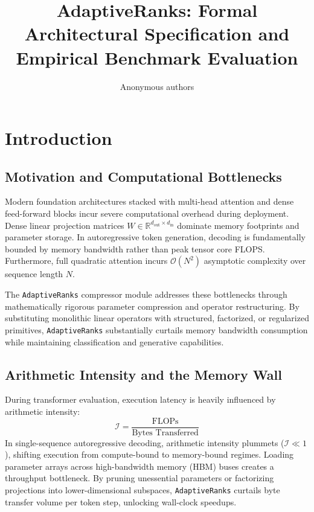 \title{\textbf{AdaptiveRanks: Formal Architectural Specification and Empirical Benchmark Evaluation}}

\author{Anonymous authors}


\section{Introduction}

\subsection{Motivation and Computational Bottlenecks}
Modern foundation architectures stacked with multi-head attention and dense feed-forward blocks incur severe computational overhead during deployment. Dense linear projection matrices $W \in \mathbb{R}^{d_{\text{out}} \times d_{\text{in}}}$ dominate memory footprints and parameter storage. In autoregressive token generation, decoding is fundamentally bounded by memory bandwidth rather than peak tensor core FLOPS. Furthermore, full quadratic attention incurs $\mathcal{O}(N^2)$ asymptotic complexity over sequence length $N$.

The \texttt{AdaptiveRanks} compressor module addresses these bottlenecks through mathematically rigorous parameter compression and operator restructuring. By substituting monolithic linear operators with structured, factorized, or regularized primitives, \texttt{AdaptiveRanks} substantially curtails memory bandwidth consumption while maintaining classification and generative capabilities.

\subsection{Arithmetic Intensity and the Memory Wall}
During transformer evaluation, execution latency is heavily influenced by arithmetic intensity:
\[
\mathcal{I} = \frac{\text{FLOPs}}{\text{Bytes Transferred}}
\]
In single-sequence autoregressive decoding, arithmetic intensity plummets ($\mathcal{I} \ll 1$), shifting execution from compute-bound to memory-bound regimes. Loading parameter arrays across high-bandwidth memory (HBM) buses creates a throughput bottleneck. By pruning unessential parameters or factorizing projections into lower-dimensional subspaces, \texttt{AdaptiveRanks} curtails byte transfer volume per token step, unlocking wall-clock speedups.

